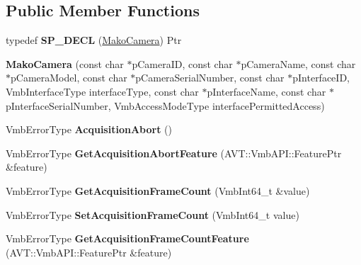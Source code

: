 \subsection*{Public Member Functions}
\begin{DoxyCompactItemize}
\item 
\hypertarget{classMakoCamera_a1f58551d1739f17407f33f81e9a81c9a}{typedef {\bfseries S\-P\-\_\-\-D\-E\-C\-L} (\hyperlink{classMakoCamera}{Mako\-Camera}) Ptr}\label{classMakoCamera_a1f58551d1739f17407f33f81e9a81c9a}

\item 
\hypertarget{classMakoCamera_a626420efebcb9c4148d8fa9d6ae7ddb1}{{\bfseries Mako\-Camera} (const char $\ast$p\-Camera\-I\-D, const char $\ast$p\-Camera\-Name, const char $\ast$p\-Camera\-Model, const char $\ast$p\-Camera\-Serial\-Number, const char $\ast$p\-Interface\-I\-D, Vmb\-Interface\-Type interface\-Type, const char $\ast$p\-Interface\-Name, const char $\ast$p\-Interface\-Serial\-Number, Vmb\-Access\-Mode\-Type interface\-Permitted\-Access)}\label{classMakoCamera_a626420efebcb9c4148d8fa9d6ae7ddb1}

\item 
\hypertarget{classMakoCamera_ad6a8803b977187ddad879c4c513a2689}{Vmb\-Error\-Type {\bfseries Acquisition\-Abort} ()}\label{classMakoCamera_ad6a8803b977187ddad879c4c513a2689}

\item 
\hypertarget{classMakoCamera_abd43c4ca6f93ebfe9b8c38dfbca5760c}{Vmb\-Error\-Type {\bfseries Get\-Acquisition\-Abort\-Feature} (A\-V\-T\-::\-Vmb\-A\-P\-I\-::\-Feature\-Ptr \&feature)}\label{classMakoCamera_abd43c4ca6f93ebfe9b8c38dfbca5760c}

\item 
\hypertarget{classMakoCamera_ad723b76155147907791ae3c3c4c43bec}{Vmb\-Error\-Type {\bfseries Get\-Acquisition\-Frame\-Count} (Vmb\-Int64\-\_\-t \&value)}\label{classMakoCamera_ad723b76155147907791ae3c3c4c43bec}

\item 
\hypertarget{classMakoCamera_a410d9eaac2599e4e6f69ea35df53c816}{Vmb\-Error\-Type {\bfseries Set\-Acquisition\-Frame\-Count} (Vmb\-Int64\-\_\-t value)}\label{classMakoCamera_a410d9eaac2599e4e6f69ea35df53c816}

\item 
\hypertarget{classMakoCamera_a2002ef7282aad5d7a843baea2492d071}{Vmb\-Error\-Type {\bfseries Get\-Acquisition\-Frame\-Count\-Feature} (A\-V\-T\-::\-Vmb\-A\-P\-I\-::\-Feature\-Ptr \&feature)}\label{classMakoCamera_a2002ef7282aad5d7a843baea2492d071}


\end{DoxyCompactItemize}

